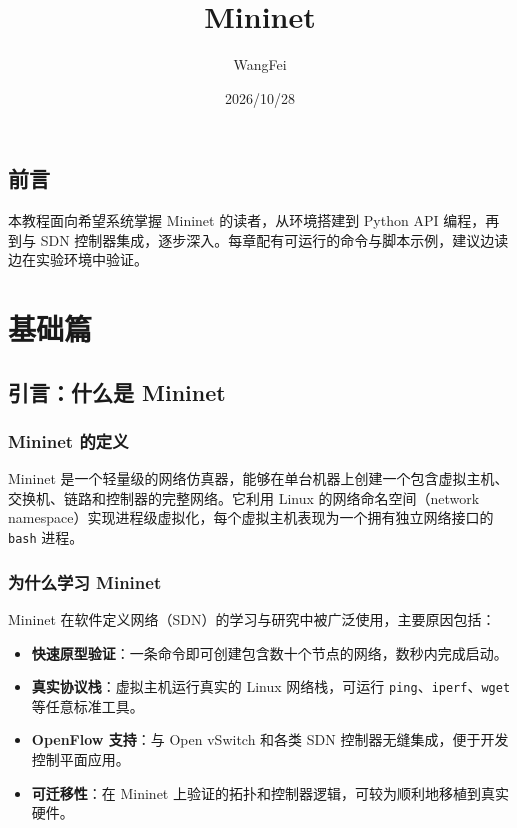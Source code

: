 \documentclass[12pt,a4paper,openany]{ctexbook}
\title{\textbf{Mininet}}
\author{WangFei}
\date{2026/10/28}
\begin{document}
\frontmatter
\maketitle

\chapter{前言}
本教程面向希望系统掌握 Mininet 的读者，从环境搭建到 Python API 编程，再到与 SDN 控制器集成，逐步深入。每章配有可运行的命令与脚本示例，建议边读边在实验环境中验证。

\tableofcontents

\mainmatter

\part{基础篇}

\chapter{引言：什么是 Mininet}

\section{Mininet 的定义}

Mininet 是一个轻量级的网络仿真器，能够在单台机器上创建一个包含虚拟主机、交换机、链路和控制器的完整网络。它利用 Linux 的网络命名空间（network namespace）实现进程级虚拟化，每个虚拟主机表现为一个拥有独立网络接口的 \texttt{bash} 进程。

\section{为什么学习 Mininet}

Mininet 在软件定义网络（SDN）的学习与研究中被广泛使用，主要原因包括：

\begin{itemize}[leftmargin=*]
	\item \textbf{快速原型验证}：一条命令即可创建包含数十个节点的网络，数秒内完成启动。
	\item \textbf{真实协议栈}：虚拟主机运行真实的 Linux 网络栈，可运行 \texttt{ping}、\texttt{iperf}、\texttt{wget} 等任意标准工具。
	\item \textbf{OpenFlow 支持}：与 Open vSwitch 和各类 SDN 控制器无缝集成，便于开发控制平面应用。
	\item \textbf{可迁移性}：在 Mininet 上验证的拓扑和控制器逻辑，可较为顺利地移植到真实硬件。
\end{itemize}
\end{document}
